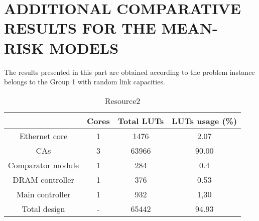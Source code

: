 

\setcounter{equation}{0}

\appendix


\let\svaddcontentsline\addcontentsline
\renewcommand\addcontentsline[3]{%
  \ifthenelse{\equal{#1}{lof}}{}%
  {\ifthenelse{\equal{#1}{lot}}{}{\svaddcontentsline{#1}{#2}{#3}}}}
  
  


\chapter{ADDITIONAL COMPARATIVE RESULTS FOR THE MEAN-RISK MODELS}
\label{sec.app1}

The results presented in this part are obtained according to the
problem instance belongs to the Group 1 with random link capacities.

\begin{table}[htbp]
\begin{center}
\caption{Resource2}
\vspace{23pt}
      \begin{tabular}{|c|c|c|c|}
        \hline
           & \textbf{Cores}  & \textbf{Total LUTs}   &  \textbf{LUTs usage (\%)}\\
           \hline
        Ethernet core & 1 & 1476 & 2.07\\
        \hline
        CAs & 3 & 63966  & 90.00\\
        \hline
        Comparator module  & 1 &  284   &  0.4      \\
        \hline
        DRAM controller    & 1 &  376   &  0.53       \\
        \hline
        Main controller    & 1 &  932   &  1,30         \\
        \hline
        Total design & -  & 65442    & 94.93\\
        \hline
      \end{tabular}
\label{tab:table2}
\end{center}
\end{table}


